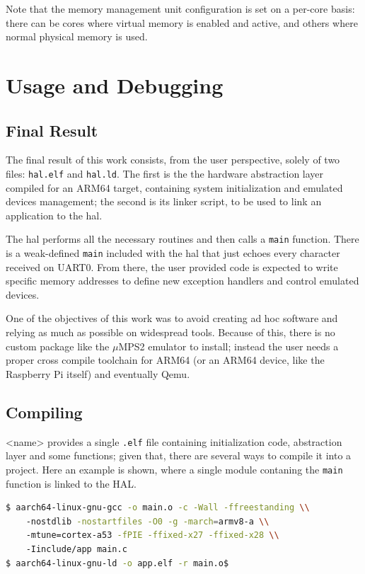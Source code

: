 \documentclass[12pt,a4paper,openright,twoside]{report}
\begin{document}
Note that the memory management unit configuration is set on a per-core basis:
there can be cores where virtual memory is enabled and active, and others where
normal physical memory is used.


\clearpage{\pagestyle{empty}\cleardoublepage}
\chapter{Usage and Debugging}
\section{Final Result}
The final result of this work consists, from the user perspective, solely of 
two files: {\tt hal.elf} and {\tt hal.ld}.
The first is the the hardware abstraction layer compiled for an ARM64 target, 
containing system initialization and emulated devices management; the second is 
its linker script, to be used to link an application to the hal.

The hal performs all the necessary routines and then calls a {\tt main} function.
There is a weak-defined {\tt main} included with the hal that just echoes every
character received on UART0.
From there, the user provided code is expected to write specific memory addresses
to define new exception handlers and control emulated devices. 

One of the objectives of this work was to avoid creating ad hoc software and
relying as much as possible on widespread tools. Because of this, there is no
custom package like the $\mu$MPS2 emulator to install; instead the user needs
a proper cross compile toolchain for ARM64 (or an ARM64 device, like the Raspberry
Pi itself) and eventually Qemu.

\section{Compiling}
<name> provides a single {\tt .elf} file containing initialization code, abstraction
layer and some functions; given that, there are several ways to compile it 
into a project. Here an example is shown, where a single module contaning the {\tt main}
function is linked to the HAL.

\begin{lstlisting}[language=bash]
$ aarch64-linux-gnu-gcc -o main.o -c -Wall -ffreestanding \\
    -nostdlib -nostartfiles -O0 -g -march=armv8-a \\
    -mtune=cortex-a53 -fPIE -ffixed-x27 -ffixed-x28 \\
    -Iinclude/app main.c
$ aarch64-linux-gnu-ld -o app.elf -r main.o$
\end{lstlisting}
\end{document}
